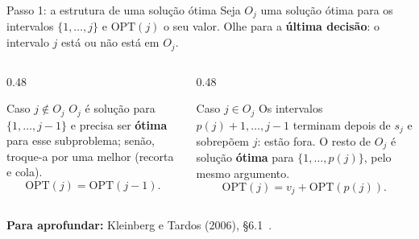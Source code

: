 \documentclass[aspectratio=169,xcolor=table]{beamer}
\newcommand{\fonte}[1]{%
  \vfill
  {\tiny\color{gray!55!black}\textbf{Para aprofundar:} #1\par}%
}
\begin{document}
\begin{frame}{Passo 1: a estrutura de uma solução ótima}
  \scriptsize Seja $O_j$ uma solução ótima para os intervalos $\{1,\dots,j\}$ e
  $\mathrm{OPT}(j)$ o seu valor. Olhe para a \textbf{última decisão}: o intervalo $j$ está
  ou não está em $O_j$.
  \medskip

  \begin{columns}[T]
    \begin{column}{0.48\textwidth}
      \begin{block}{Caso $j \notin O_j$}
        \scriptsize $O_j$ é solução para $\{1,\dots,j-1\}$ e precisa ser \textbf{ótima} para
        esse subproblema; senão, troque-a por uma melhor (recorta e cola).
        \[ \mathrm{OPT}(j) = \mathrm{OPT}(j-1). \]
      \end{block}
    \end{column}
    \begin{column}{0.48\textwidth}
      \begin{block}{Caso $j \in O_j$}
        \scriptsize Os intervalos $p(j)+1,\dots,j-1$ terminam depois de $s_j$ e
        sobrepõem $j$: estão fora. O resto de $O_j$ é solução \textbf{ótima} para
        $\{1,\dots,p(j)\}$, pelo mesmo argumento.
        \[ \mathrm{OPT}(j) = v_j + \mathrm{OPT}(p(j)). \]
      \end{block}
    \end{column}
  \end{columns}
  \fonte{Kleinberg e Tardos (2006), \S 6.1~\cite{kleinberg2006algorithm}.}
\end{frame}
\end{document}
